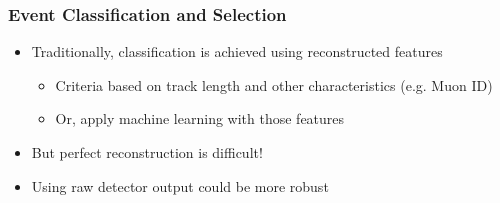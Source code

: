 \documentclass[10pt,professionalfonts,xcolor=table]{beamer}
\begin{document}
\begin{frame}
\frametitle{Event Classification and Selection}

\begin{itemize}
\item Traditionally, classification is achieved using reconstructed features
   \begin{itemize}
  \item Criteria based on track length and other characteristics (e.g. Muon ID)
  \item Or, apply machine learning with those features
  \end{itemize}
\gap
\item But perfect reconstruction is difficult!
\gap
\item Using raw detector output could be more robust
\end{itemize}
\end{frame}
\end{document}
